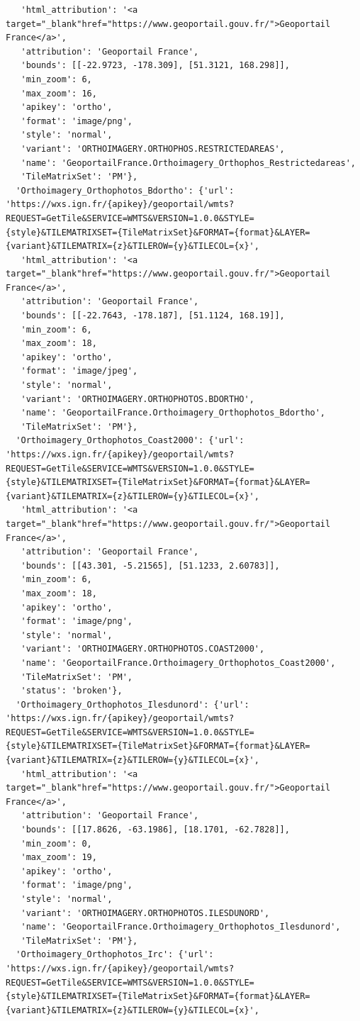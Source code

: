 \documentclass[
  letterpaper,
  DIV=11,
  numbers=noendperiod]{scrreprt}
\begin{document}
\begin{verbatim}
   'html_attribution': '<a target="_blank"href="https://www.geoportail.gouv.fr/">Geoportail France</a>',
   'attribution': 'Geoportail France',
   'bounds': [[-22.9723, -178.309], [51.3121, 168.298]],
   'min_zoom': 6,
   'max_zoom': 16,
   'apikey': 'ortho',
   'format': 'image/png',
   'style': 'normal',
   'variant': 'ORTHOIMAGERY.ORTHOPHOS.RESTRICTEDAREAS',
   'name': 'GeoportailFrance.Orthoimagery_Orthophos_Restrictedareas',
   'TileMatrixSet': 'PM'},
  'Orthoimagery_Orthophotos_Bdortho': {'url': 'https://wxs.ign.fr/{apikey}/geoportail/wmts?REQUEST=GetTile&SERVICE=WMTS&VERSION=1.0.0&STYLE={style}&TILEMATRIXSET={TileMatrixSet}&FORMAT={format}&LAYER={variant}&TILEMATRIX={z}&TILEROW={y}&TILECOL={x}',
   'html_attribution': '<a target="_blank"href="https://www.geoportail.gouv.fr/">Geoportail France</a>',
   'attribution': 'Geoportail France',
   'bounds': [[-22.7643, -178.187], [51.1124, 168.19]],
   'min_zoom': 6,
   'max_zoom': 18,
   'apikey': 'ortho',
   'format': 'image/jpeg',
   'style': 'normal',
   'variant': 'ORTHOIMAGERY.ORTHOPHOTOS.BDORTHO',
   'name': 'GeoportailFrance.Orthoimagery_Orthophotos_Bdortho',
   'TileMatrixSet': 'PM'},
  'Orthoimagery_Orthophotos_Coast2000': {'url': 'https://wxs.ign.fr/{apikey}/geoportail/wmts?REQUEST=GetTile&SERVICE=WMTS&VERSION=1.0.0&STYLE={style}&TILEMATRIXSET={TileMatrixSet}&FORMAT={format}&LAYER={variant}&TILEMATRIX={z}&TILEROW={y}&TILECOL={x}',
   'html_attribution': '<a target="_blank"href="https://www.geoportail.gouv.fr/">Geoportail France</a>',
   'attribution': 'Geoportail France',
   'bounds': [[43.301, -5.21565], [51.1233, 2.60783]],
   'min_zoom': 6,
   'max_zoom': 18,
   'apikey': 'ortho',
   'format': 'image/png',
   'style': 'normal',
   'variant': 'ORTHOIMAGERY.ORTHOPHOTOS.COAST2000',
   'name': 'GeoportailFrance.Orthoimagery_Orthophotos_Coast2000',
   'TileMatrixSet': 'PM',
   'status': 'broken'},
  'Orthoimagery_Orthophotos_Ilesdunord': {'url': 'https://wxs.ign.fr/{apikey}/geoportail/wmts?REQUEST=GetTile&SERVICE=WMTS&VERSION=1.0.0&STYLE={style}&TILEMATRIXSET={TileMatrixSet}&FORMAT={format}&LAYER={variant}&TILEMATRIX={z}&TILEROW={y}&TILECOL={x}',
   'html_attribution': '<a target="_blank"href="https://www.geoportail.gouv.fr/">Geoportail France</a>',
   'attribution': 'Geoportail France',
   'bounds': [[17.8626, -63.1986], [18.1701, -62.7828]],
   'min_zoom': 0,
   'max_zoom': 19,
   'apikey': 'ortho',
   'format': 'image/png',
   'style': 'normal',
   'variant': 'ORTHOIMAGERY.ORTHOPHOTOS.ILESDUNORD',
   'name': 'GeoportailFrance.Orthoimagery_Orthophotos_Ilesdunord',
   'TileMatrixSet': 'PM'},
  'Orthoimagery_Orthophotos_Irc': {'url': 'https://wxs.ign.fr/{apikey}/geoportail/wmts?REQUEST=GetTile&SERVICE=WMTS&VERSION=1.0.0&STYLE={style}&TILEMATRIXSET={TileMatrixSet}&FORMAT={format}&LAYER={variant}&TILEMATRIX={z}&TILEROW={y}&TILECOL={x}',

\end{verbatim}
\end{document}
